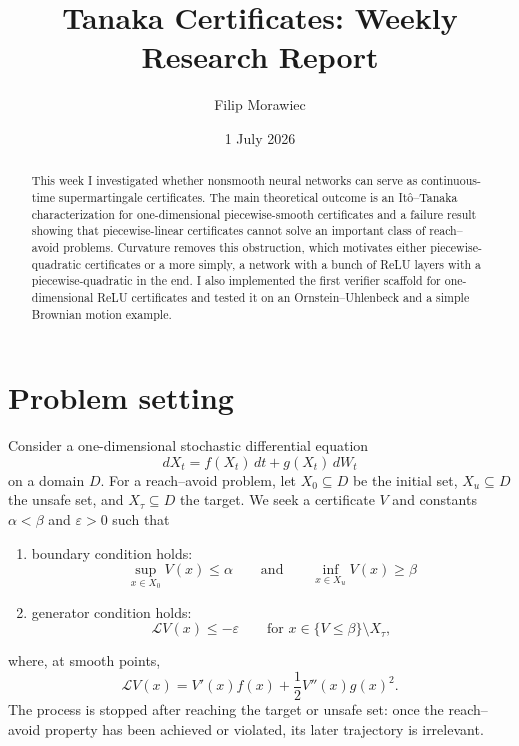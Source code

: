 \documentclass[10pt]{extarticle}
\title{Tanaka Certificates: Weekly Research Report}
\author{Filip Morawiec}
\date{1 July 2026}
\begin{document}
\maketitle

\begin{abstract}
This week I investigated whether nonsmooth neural networks can serve as
continuous-time supermartingale certificates.  The main theoretical outcome is
an It\^o--Tanaka characterization for one-dimensional piecewise-smooth
certificates and a failure result showing that piecewise-linear certificates
cannot solve an important class of reach--avoid problems.  Curvature removes
this obstruction, which motivates either piecewise-quadratic certificates or a
more simply, a network with a bunch of ReLU layers with a piecewise-quadratic in the end.
I also implemented the first verifier scaffold for one-dimensional ReLU certificates and tested it
on an Ornstein--Uhlenbeck and a simple Brownian motion example.
\end{abstract}

\section{Problem setting}

Consider a one-dimensional stochastic differential equation
\begin{equation}
  dX_t=f(X_t)\,dt+g(X_t)\,dW_t
  \label{eq:sde}
\end{equation}
on a domain $D$.  For a reach--avoid problem, let $X_0\subseteq D$ be the
initial set, $X_u\subseteq D$ the unsafe set, and $X_\tau\subseteq D$ the target.
We seek a certificate $V$ and constants $\alpha<\beta$ and $\varepsilon>0$
such that
\begin{enumerate}
  \item boundary condition holds: 
  \begin{equation}
    \label{eq:boundary-conditions}
    \sup_{x\in X_0}V(x)\leq\alpha \qquad\text{and}\qquad
    \inf_{x\in X_u}V(x)\geq\beta
  \end{equation}
  \item generator condition holds: 
  \begin{equation}
    \label{eq:generator-conditions}
    \mathcal LV(x)\leq-\varepsilon \qquad\text{for }x\in\{V\leq\beta\}\setminus X_\tau,
  \end{equation}
\end{enumerate}
where, at smooth points,
\begin{equation}
  \mathcal LV(x)=V'(x)f(x)+\frac12V''(x)g(x)^2.
  \label{eq:generator}
\end{equation}
The process is stopped after reaching the target or unsafe set: once the
reach--avoid property has been achieved or violated, its later trajectory is
irrelevant.
\end{document}
